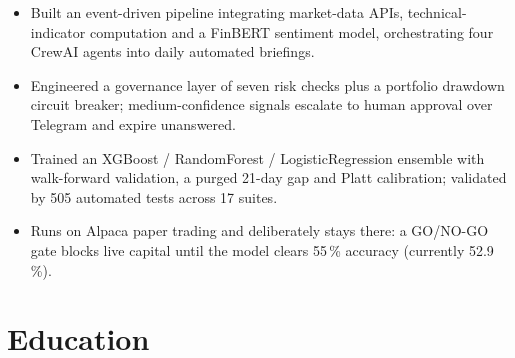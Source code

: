\begin{itemize}
  \item Built an event-driven pipeline integrating market-data APIs, technical-indicator computation and
        a FinBERT sentiment model, orchestrating four CrewAI agents into daily automated briefings.
  \item Engineered a governance layer of seven risk checks plus a portfolio drawdown circuit breaker;
        medium-confidence signals escalate to human approval over Telegram and expire unanswered.
  \item Trained an XGBoost / RandomForest / LogisticRegression ensemble with walk-forward validation, a
        purged 21-day gap and Platt calibration; validated by 505 automated tests across 17 suites.
  \item Runs on Alpaca paper trading and deliberately stays there: a GO/NO-GO gate blocks live capital
        until the model clears 55\,\% accuracy (currently 52.9\,\%).
\end{itemize}

\fi

\section{Education}

